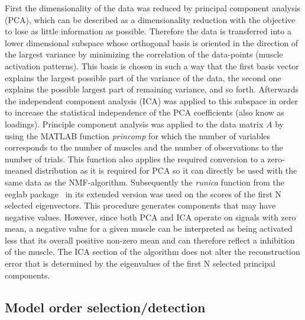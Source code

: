 First the dimensionality of the data was reduced by principal component analysis (PCA), which can be described as a dimensionality reduction with the objective to lose as little information as possible. Therefore the data is transferred into a lower dimensional subspace whose orthogonal basis is oriented in the direction of the largest variance by minimizing the correlation of the data-points (muscle activation patterns). This basis is chosen in such a way that the first basis vector explains the largest possible part of the variance of the data, the second one explains the possible largest part of remaining variance, and so forth. Afterwards the independent component analysis (ICA) was applied to this subspace in order to increase the statistical independence of the PCA coefficients (also know as loadings). Principle component analysis was applied to the data matrix $A$ by using the MATLAB function \emph{princomp} for which the number of variables corresponds to the number of muscles and the number of observations to the number of trials. This function also applies the required conversion to a zero-meaned distribution as it is required for PCA so it can directly be used with the same data as the NMF-algorithm. Subsequently the \emph{runica} function from the eeglab package~\citet{eeg} in its extended version was used on the scores of the first N selected eigenvectors. 
This procedure generates components that may have negative values. However, since both PCA and ICA operate on signals with zero mean, a negative value for a given muscle can be interpreted as being activated less that its overall positive non-zero mean and can therefore reflect a inhibition of the muscle. The ICA section of the algorithm does not alter the reconstruction error that is determined by the eigenvalues of the first N selected principal components.

\subsection{Model order selection/detection} %
\label{sg:sub:model_order}

